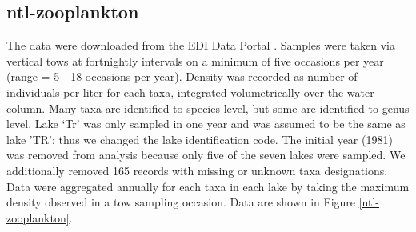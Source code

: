 \documentclass[11pt, oneside]{article}
\begin{document}
\subsection {ntl-zooplankton}
The data were downloaded from the EDI Data Portal \citep{ntl-zooplankton}.
Samples were taken  via vertical tows at fortnightly intervals on a minimum of five occasions per year (range = 5 - 18 occasions per year).
Density was recorded as number of individuals per liter for each taxa, integrated volumetrically over the water column.
Many taxa are identified to species level, but some are identified to genus level.
Lake `Tr'  was only sampled in one year and was assumed to be the same as lake 'TR'; thus we changed the lake identification code. 
The initial year (1981) was removed from analysis because only five of the seven lakes were sampled.
We additionally removed 165 records with missing or unknown taxa designations.
Data were aggregated annually for each taxa in each lake by taking the maximum density observed in a tow sampling occasion.
Data are shown in Figure \ref{ntl-zooplankton}.
\end{document}
